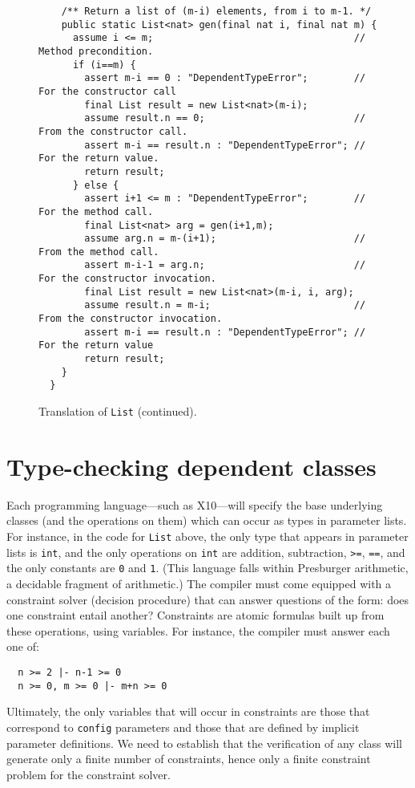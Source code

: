 \documentclass[nocopyrightspace,preprint,9pt]{sigplanconf}
\newcommand\Xten{{X10}}
\begin{document}
\begin{figure*}
{\begin{verbatim}
    /** Return a list of (m-i) elements, from i to m-1. */
    public static List<nat> gen(final nat i, final nat m) {
      assume i <= m;                                   // Method precondition.
      if (i==m) {
        assert m-i == 0 : "DependentTypeError";        // For the constructor call
        final List result = new List<nat>(m-i);
        assume result.n == 0;                          // From the constructor call.
        assert m-i == result.n : "DependentTypeError"; // For the return value.
        return result;
      } else {
        assert i+1 <= m : "DependentTypeError";        // For the method call.
        final List<nat> arg = gen(i+1,m);
        assume arg.n = m-(i+1);                        // From the method call.
        assert m-i-1 = arg.n;                          // For the constructor invocation.
        final List result = new List<nat>(m-i, i, arg);
        assume result.n = m-i;                         // From the constructor invocation.
        assert m-i == result.n : "DependentTypeError"; // For the return value
        return result;
    }
  }
\end{verbatim}}
\caption{Translation of {\tt List} (continued).}\label{List-translation-2}
\end{figure*}

\section{Type-checking dependent classes}

Each programming language---such as \Xten{}---will specify the base
underlying classes (and the operations on them) which can occur as
types in parameter lists. For instance, in the code for {\tt List}
above, the only type that appears in parameter lists is {\tt int}, and
the only operations on {\tt int} are addition, subtraction, {\tt >=},
{\tt ==}, and the only constants are {\tt 0} and {\tt 1}.  (This
language falls within Presburger arithmetic, a decidable fragment of
arithmetic.)  The compiler must come equipped with a constraint solver
(decision procedure) that can answer questions of the form: does one
constraint entail another?  Constraints are atomic formulas built up
from these operations, using variables. For instance, the compiler
must answer each one of:
{\footnotesize
\begin{verbatim}
  n >= 2 |- n-1 >= 0
  n >= 0, m >= 0 |- m+n >= 0
\end{verbatim}}

Ultimately, the only variables that will occur in constraints are
those that correspond to {\tt config} parameters and those that are
defined by implicit parameter definitions. We need to establish that
the verification of any class will generate only a finite number of
constraints, hence only a finite constraint problem for the constraint
solver.
\end{document}
